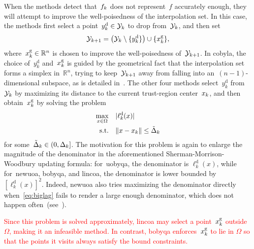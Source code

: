 \documentclass[
    smallextended,  %
    final,        %
]{svjour3}
\newcommand{\R}{\mathbb{R}}
\newcommand{\abs}[2][]{#1\lvert#2#1\rvert}
\newcommand{\drop}{{\text{d}}}
\newcommand{\fset}{\Omega}
\newcommand{\geo}{{\text{g}}}
\newcommand{\iter}[1][k]{x\ifthenelse{\equal{#1}{}}{}{_{#1}}}
\newcommand{\norm}[2][]{#1\lVert#2#1\rVert}
\newcommand{\objm}[1][k]{\obj\ifthenelse{\equal{#1}{}}{}{_{#1}}}
\newcommand{\obj}{f}
\newcommand{\radalt}[1][k]{\tilde{\Delta}\ifthenelse{\equal{#1}{}}{}{_{#1}}}
\newcommand{\rad}[1][k]{\Delta\ifthenelse{\equal{#1}{}}{}{_{#1}}}
\newcommand{\set}[2][]{#1\{#2#1\}}
\newcommand{\st}{\text{s.t.}}
\newcommand{\xpt}[1][k]{\mathcal{Y}\ifthenelse{\equal{#1}{}}{}{_{#1}}}
\newcommand{\red}{\textcolor{red}}
\begin{document}
When the methods detect that~$\objm$ does not represent~$\obj$ accurately enough, they will attempt
to improve the well-poisedness of the interpolation set.
In this case, the methods first select a point~$y_k^{\drop} \in \xpt$ to drop from~$\xpt$, and then set
\begin{equation}
    \label{eq:xpt-update-geo}
    \xpt[k + 1] = \big(\xpt \setminus \set{y_k^{\drop}}\big) \cup \set{\iter^{\geo}},
\end{equation}
where~$\iter^{\geo} \in \R^n$ is chosen to improve the well-poisedness of~$\xpt[k + 1]$.
In \gls{cobyla}, the choice of~$y_k^{\drop}$ and~$\iter^{\geo}$ is guided by the geometrical fact
that the interpolation set forms a simplex in~$\R^n$, trying to keep~$\xpt[k+1]$ away from falling into
an~$(n-1)$-dimensional subspace, as is detailed in~\cite[equations~(15)--(17)]{Powell_1994}.
The other four methods select~$y_k^{\drop}$ from~$\xpt$ by maximizing its distance to
the current trust-region center~$\iter$, and then obtain~$\iter^{\geo}$ by solving the problem
\begin{equation}
    \label{eq:biglag}
    \begin{split}
        \max_{x \in \fset}  & \quad \abs{\ell_k^{\drop}(x)}\\
        \st                 & \quad \norm{x - \iter} \le \radalt
    \end{split}
\end{equation}
for some~$\radalt \in (0, \rad]$.
The motivation for this problem is again to enlarge the magnitude of the
denominator in the aforementioned Sherman-Morrison-Woodbury updating formula:
for~\gls{uobyqa}, the denominator is $\ell_k^{\drop}(x)$, while for~\gls{newuoa}, \gls{bobyqa},
and \gls{lincoa}, the denominator is lower bounded by $[\ell_k^{\drop}(x)]^2$.
Indeed, \gls{newuoa} also tries maximizing the denominator directly when~\eqref{eq:biglag}
fails to render a large enough denominator, which does not happen often~(see~\cite[\S~6]{Powell_2006}).

\red{
Since this problem is solved approximately, \gls{lincoa} may select a point~$\iter^{\geo}$
outside~$\fset$, making it an infeasible method.
In contrast, \gls{bobyqa} enforces~$\iter^{\geo}$ to lie in $\fset$ so that the points it visits
always satisfy the bound constraints.
}

\subsection{}
\label{ssec:cobyla}
\end{document}
